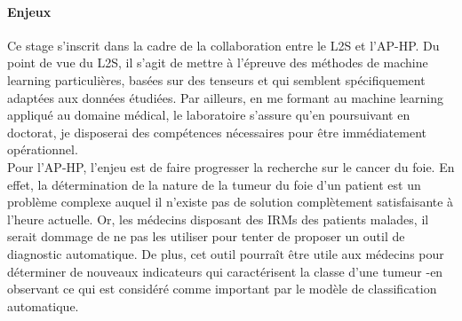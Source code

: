\documentclass[preprint,12pt]{elsarticle}
\begin{document}
\paragraph*{Enjeux} Ce stage s'inscrit dans la cadre de la collaboration entre le L2S et l'AP-HP. Du point de vue du L2S, il s'agit de mettre à l'épreuve des méthodes de machine learning particulières, basées sur des tenseurs et qui semblent spécifiquement adaptées aux données étudiées. Par ailleurs, en me formant au machine learning appliqué au domaine médical, le laboratoire s'assure qu'en poursuivant en doctorat, je disposerai des compétences nécessaires pour être immédiatement opérationnel.\\
\indent Pour l'AP-HP, l'enjeu est de faire progresser la recherche sur le cancer du foie. En effet, la détermination de la nature de la tumeur du foie d'un patient est un problème complexe auquel il n'existe pas de solution complètement satisfaisante à l'heure actuelle. Or, les médecins disposant des IRMs des patients malades, il serait dommage de ne pas les utiliser pour tenter de proposer un outil de diagnostic automatique. De plus, cet outil pourraît être utile aux médecins pour déterminer de nouveaux indicateurs qui caractérisent la classe d'une tumeur -en observant ce qui est considéré comme important par le modèle de classification automatique.
\end{document}
